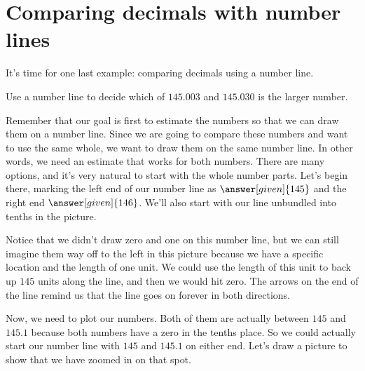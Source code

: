 \documentclass{ximera}
\begin{document}
\section{Comparing decimals with number lines}


It's time for one last example: comparing decimals using a number line.

\begin{example}
Use a number line to decide which of $145.003$ and $145.030$ is the larger number.

Remember that our goal is first to estimate the numbers so that we can draw them on a number line. Since we are going to compare these numbers and want to use the same whole, we want to draw them on the same number line. In other words, we need an estimate that works for both numbers. There are many options, and it's very natural to start with the whole number parts. Let's begin there, marking the left end of our number line as $\answer[given]{145}$ and the right end $\answer[given]{146}$. We'll also start with our line unbundled into tenths in the picture.

\begin{image}
 \end{image}

Notice that we didn't draw zero and one on this number line, but we can still imagine them way off to the left in this picture because we have a specific location and the length of one unit.  We could use the length of this unit to back up $145$ units along the line, and then we would hit zero. The arrows on the end of the line remind us that the line goes on forever in both directions.

Now, we need to plot our numbers. Both of them are actually between $145$ and $145.1$ because both numbers have a zero in the tenths place. So we could actually start our number line with $145$ and $145.1$ on either end. Let's draw a picture to show that we have zoomed in on that spot.



\end{example}
\end{document}
